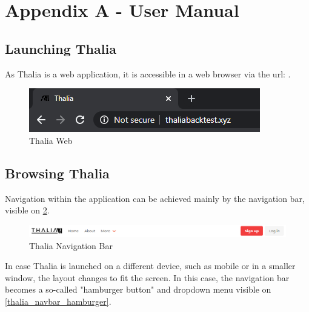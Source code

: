 \documentclass[main.tex]{subfiles}
\begin{document}
\section{Appendix A - User Manual}
\label{user_manual}
\subsection{Launching Thalia}
As Thalia is a web application, it is accessible in a web browser via the url: .



\begin{figure}[H]

   \centering

   \includegraphics[scale=0.8]{08Appendices/081User/081Pictures/thalia_domain.png}

   \caption{Thalia Web}

   \label{thalia_web}

\end{figure}

\subsection{Browsing Thalia}

Navigation within the application can be achieved mainly by the navigation bar, visible on \figurename{\ref{thalia_navbar}}.



\begin{figure}[H]

   \centering

   \includegraphics[width=\textwidth]{08Appendices/081User/081Pictures/navbar.png}

   \caption{Thalia Navigation Bar}

   \label{thalia_navbar}

\end{figure}



In case Thalia is launched on a different device, such as mobile or in a smaller window, the layout changes to fit the screen. In this case, the navigation bar becomes a so-called "hamburger button" and dropdown menu visible on \figurename{\ref{thalia_navbar_hamburger}}.
\end{document}
